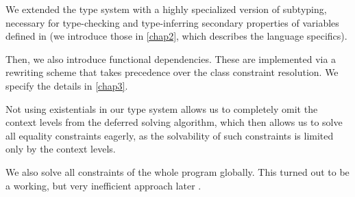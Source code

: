 We extended the type system with a highly specialized version of subtyping, necessary for type-checking and type-inferring secondary properties of variables defined in \cmm (we introduce those in \cref{chap2}, which describes the language specifics).

Then, we also introduce functional dependencies. These are implemented via a rewriting scheme that takes precedence over the class constraint resolution. We specify the details in \cref{chap3}.

Not using existentials in our type system allows us to completely omit the context levels from the deferred solving algorithm, which then allows us to solve all equality constraints eagerly, as the solvability of such constraints is limited only by the context levels.

We also solve all constraints of the whole program globally. This turned out to be a working, but very inefficient approach later .
